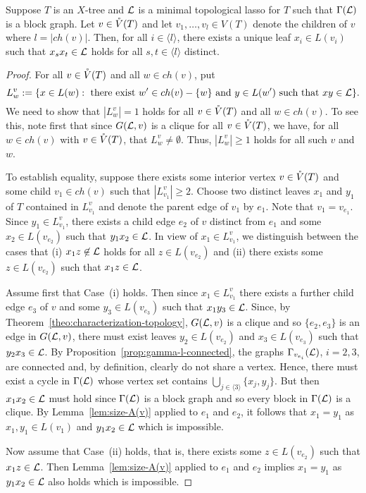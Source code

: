 \begin{pro}\label{prop:x-i-unique}
Suppose $T$ is an $X$-tree and ${\mathcal L}$ is a minimal topological 
lasso for $T$ such that $\Gamma({\mathcal L})$ is a block graph.
Let $v\in \mathring{V}(T)$ and let $v_1,\ldots, v_l\in V(T)$ denote the
children of $v$ where
$l=|ch(v)|$.
Then, for all $i\in \langle l\rangle$, there exists a unique 
leaf $x_i\in L(v_i)$ such that $x_sx_t\in {\mathcal L}$ holds for
all $s,t\in\langle l\rangle$ distinct.
\end{pro}
\begin{proof}
For all $v\in \mathring{V}(T)$ and all $w\in ch(v)$, put
$$
L^v_w:=\{x\in L(w): \mbox{ there exist } w'\in ch(v)-\{w\}
\mbox{ and } y\in L(w')
\mbox{ such that } xy\in {\mathcal L}  \}.
$$
We need to show that $|L^v_w|=1$ holds for all $v\in \mathring{V}(T)$ 
and all $w\in ch(v)$. To see this,
note first that since $G({\mathcal L},v)$ is a clique for all $v\in \mathring{V}(T)$, 
we have, for all $w\in ch(v)$ with $v\in \mathring{V}(T)$, that $L^v_w\not=\emptyset$. 
Thus,  $|L^v_w|\geq 1$ holds for all such $v$ and $w$.


To establish equality, suppose there exists some interior vertex  
$v\in \mathring{V}(T)$ and 
some child $v_1\in ch(v)$ such that $|L^v_{v_1}|\geq 2$.
Choose two distinct leaves $x_1$ and $y_1$ of $T$ 
contained in $L^v_{v_1}$
and denote the parent edge of $v_1$ by $e_1$. Note that $v_1=v_{e_1}$.
Since $y_1\in L^v_{v_1}$, there exists a child edge $e_2$ of $v$
distinct from $e_1$ and some $x_2\in L(v_{e_2})$ such that
$y_1x_2\in{\mathcal L}$. In view of $x_1\in L^v_{v_1}$, we 
distinguish between the cases that
(i) $x_1z\not\in{\mathcal L}$ holds for all 
$z\in L(v_{e_2})$ and (ii) 
there exists some $z\in L(v_{e_2})$ such that
$x_1z\in{\mathcal L}$.

Assume first that Case~(i) holds.
Then since $x_1\in L^v_{v_1}$ there exists 
a further child edge $e_3$ of $v$
and some $y_3\in L(v_{e_3})$ such that $x_1y_3\in{\mathcal L}$.
Since, by Theorem~\ref{theo:characterization-topology}, 
$G({\mathcal L},v)$ is a clique and so $\{e_2,e_3\}$ is an edge 
in $G({\mathcal L},v)$, there must exist leaves 
$y_2\in L(v_{e_2})$ and 
$x_3\in L(v_{e_3})$ such that 
$y_2x_3\in{\mathcal L}$. By 
Proposition~\ref{prop:gamma-l-connected}, the graphs 
$\Gamma_{v_{e_i}}({\mathcal L})$, $i=2,3$,
are connected and, by definition, clearly do not share a
vertex. Hence, there must exist a cycle  in $\Gamma({\mathcal L})$ whose vertex
set contains $\bigcup_{j\in\langle 3\rangle} \{x_j,y_j\}$. But then
$x_1x_2\in {\mathcal L}$ must hold since
 $\Gamma({\mathcal L})$
is a block graph and so every block in $\Gamma({\mathcal L})$ 
is a clique. By Lemma~\ref{lem:size-A(v)} 
applied to $e_1$ and $e_2$, it follows that $x_1=y_1$
as $x_1,y_1\in L(v_1)$ and $y_1x_2\in {\mathcal L}$ which
is impossible.

Now assume that Case~(ii) holds, that is, there exists some
$z\in L(v_{e_2})$ such that $x_1z\in{\mathcal L}$. Then 
Lemma~\ref{lem:size-A(v)} applied to $e_1$ and $e_2$
 implies $x_1=y_1$ as $y_1x_2\in{\mathcal L}$ also holds which is impossible.
 \qquad
\end{proof}

